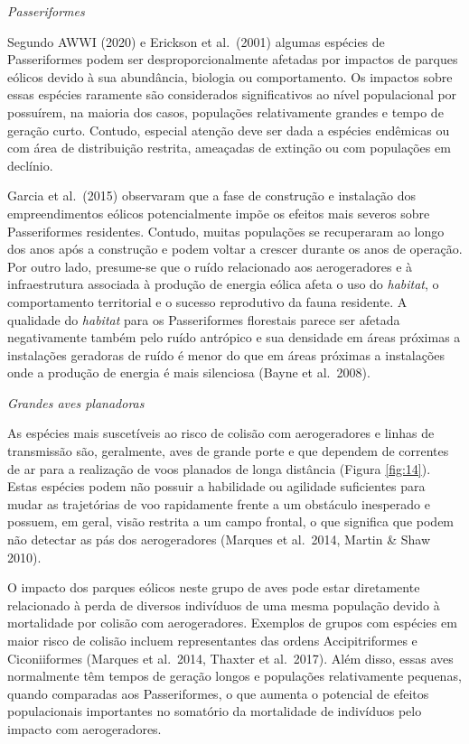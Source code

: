 \documentclass[
  oneside]{scrbook}
\begin{document}
\emph{Passeriformes}

Segundo AWWI (2020) e Erickson et al.~(2001) algumas espécies de Passeriformes podem ser desproporcionalmente afetadas por impactos de parques eólicos devido à sua abundância, biologia ou comportamento. Os impactos sobre essas espécies raramente são considerados significativos ao nível populacional por possuírem, na maioria dos casos, populações relativamente grandes e tempo de geração curto. Contudo, especial atenção deve ser dada a espécies endêmicas ou com área de distribuição restrita, ameaçadas de extinção ou com populações em declínio.

Garcia et al.~(2015) observaram que a fase de construção e instalação dos empreendimentos eólicos potencialmente impõe os efeitos mais severos sobre Passeriformes residentes. Contudo, muitas populações se recuperaram ao longo dos anos após a construção e podem voltar a crescer durante os anos de operação. Por outro lado, presume-se que o ruído relacionado aos aerogeradores e à infraestrutura associada à produção de energia eólica afeta o uso do \emph{habitat}, o comportamento territorial e o sucesso reprodutivo da fauna residente. A qualidade do \emph{habitat} para os Passeriformes florestais parece ser afetada negativamente também pelo ruído antrópico e sua densidade em áreas próximas a instalações geradoras de ruído é menor do que em áreas próximas a instalações onde a produção de energia é mais silenciosa (Bayne et al.~2008).

\emph{Grandes aves planadoras}

As espécies mais suscetíveis ao risco de colisão com aerogeradores e linhas de transmissão são, geralmente, aves de grande porte e que dependem de correntes de ar para a realização de voos planados de longa distância (Figura \ref{fig:14}). Estas espécies podem não possuir a habilidade ou agilidade suficientes para mudar as trajetórias de voo rapidamente frente a um obstáculo inesperado e possuem, em geral, visão restrita a um campo frontal, o que significa que podem não detectar as pás dos aerogeradores (Marques et al.~2014, Martin \& Shaw 2010).

O impacto dos parques eólicos neste grupo de aves pode estar diretamente relacionado à perda de diversos indivíduos de uma mesma população devido à mortalidade por colisão com aerogeradores. Exemplos de grupos com espécies em maior risco de colisão incluem representantes das ordens Accipitriformes e Ciconiiformes (Marques et al.~2014, Thaxter et al.~2017). Além disso, essas aves normalmente têm tempos de geração longos e populações relativamente pequenas, quando comparadas aos Passeriformes, o que aumenta o potencial de efeitos populacionais importantes no somatório da mortalidade de indivíduos pelo impacto com aerogeradores.
\end{document}
